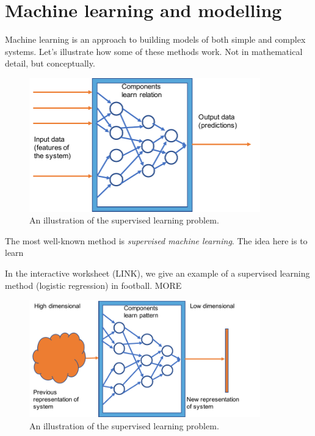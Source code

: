 \section{Machine learning and modelling}

\label{sec:mathmodels}

Machine learning is an approach to building models of both simple and complex systems. Let's illustrate how some of these methods work. Not in mathematical detail, but conceptually.


\begin{figure}[t]
\centering
\includegraphics[width=10cm]{Figures/Complexity/SupervisedLearning.pdf}
\centering
\caption{An illustration of the supervised learning problem.   \label{fig:SupervisedLearning}}
\end{figure}


The most well-known method is {\it supervised machine learning}. The idea here is to learn 


In the interactive worksheet (LINK), we give an example of a supervised learning method (logistic regression) in football. MORE  


\begin{figure}[t]
\centering
\includegraphics[width=10cm]{Figures/Complexity/UnsupervisedLearning.pdf}
\centering
\caption{An illustration of the supervised learning problem.   \label{fig:UnsupervisedLearning}}
\end{figure}

